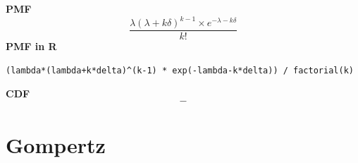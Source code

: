 \smallskip \noindent \hspace{.2cm} \textbf{PMF} 
\begin{equation*}\frac{\lambda (\lambda+k\delta)^{k-1}\times e^{-\lambda - k \delta}}{k!}\end{equation*}
\smallskip \noindent \hspace{.2cm} \textbf{PMF in R}  
\begin{verbatim}
(lambda*(lambda+k*delta)^(k-1) * exp(-lambda-k*delta)) / factorial(k)
\end{verbatim}
\smallskip \noindent \hspace{.2cm} \textbf{CDF} 
\begin{equation*}-\end{equation*}
%
%
% 
%
%
%
%
\smallskip\section*{Gompertz} 

